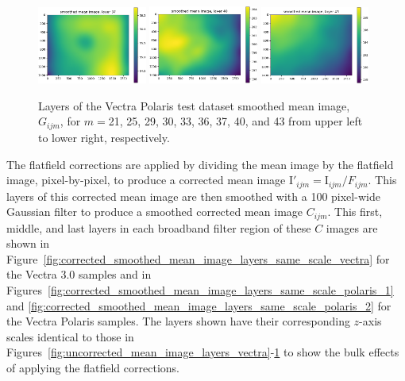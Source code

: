 \documentclass[letterpaper,11pt]{article}
\newcommand{\reffig}[1]{Figure~\ref{#1}}
\newcommand{\Iota}{\mathrm{I}}
\begin{document}
\begin{figure}[!ht]
\includegraphics[width=0.32\textwidth]{images/results/smoothed_mean_image_layers_polaris/smoothed_mean_image_layer_37}
\includegraphics[width=0.32\textwidth]{images/results/smoothed_mean_image_layers_polaris/smoothed_mean_image_layer_40}
\includegraphics[width=0.32\textwidth]{images/results/smoothed_mean_image_layers_polaris/smoothed_mean_image_layer_43}
\caption{\footnotesize Layers of the Vectra Polaris test dataset smoothed mean image, $G_{ijm}$, for $m=$21, 25, 29, 30, 33, 36, 37, 40, and 43 from upper left to lower right, respectively.}
\label{fig:uncorrected_mean_image_layers_polaris_2}
\end{figure}

The flatfield corrections are applied by dividing the mean image by the flatfield image, pixel-by-pixel, to produce a corrected mean image $\Iota'_{ijm}=\Iota_{ijm}/F_{ijm}$. This layers of this corrected mean image are then smoothed with a 100 pixel-wide Gaussian filter to produce a smoothed corrected mean image $C_{ijm}$. This first, middle, and last layers in each broadband filter region of these $C$ images are shown in \reffig{fig:corrected_smoothed_mean_image_layers_same_scale_vectra} for the Vectra 3.0 samples and in Figures~\ref{fig:corrected_smoothed_mean_image_layers_same_scale_polaris_1} and \ref{fig:corrected_smoothed_mean_image_layers_same_scale_polaris_2} for the Vectra Polaris samples. The layers shown have their corresponding $z$-axis scales identical to those in Figures~\ref{fig:uncorrected_mean_image_layers_vectra}-\ref{fig:uncorrected_mean_image_layers_polaris_2} to show the bulk effects of applying the flatfield corrections.
\end{document}
